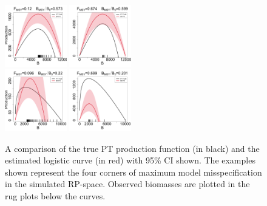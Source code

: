 \begin{figure}
\vspace{-0.5cm}
\includegraphics[width=0.24\textwidth]{../ptNew/srrCompareFlatT30X0.12Z0.573.png}
\includegraphics[width=0.24\textwidth]{../ptNew/srrCompareFlatT30X0.674Z0.599.png}\\
\includegraphics[width=0.24\textwidth]{../ptNew/srrCompareFlatT30X0.096Z0.22.png}
\includegraphics[width=0.24\textwidth]{../ptNew/srrCompareFlatT30X0.699Z0.201.png}
\caption{
A comparison of the true PT production function (in black) and the estimated logistic curve (in red)
with 95\% CI shown. The examples shown represent the four corners of maximum model misspecification
in the simulated RP-space. Observed biomasses are plotted in the rug plots below the curves.
}
\label{flatProd}
\end{figure}


